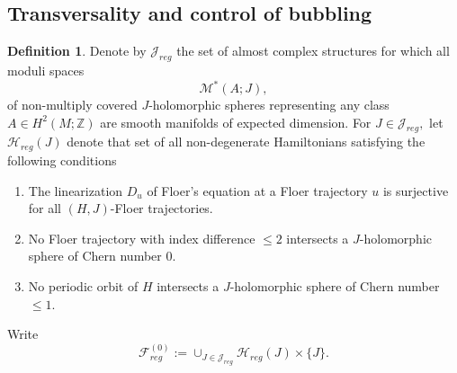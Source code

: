 \documentclass[11pt]{amsart}
\newcommand{\Z}{\mathbb{Z}}
\theoremstyle{definition}
\newtheorem{df}[tm]{Definition}
\theoremstyle{remark}
\begin{document}
\subsection{Transversality and control of bubbling}\label{subsecBubbCont}
\begin{df}\label{Flreg}
Denote by $\mathcal{J}_{reg}$ the set of almost complex structures for which all moduli spaces
\[
\mathcal{M}^*(A;J),
\]
of non-multiply covered $J$-holomorphic spheres representing any class $A\in H^2(M;\Z)$ are smooth manifolds of expected dimension. For $J\in\mathcal{J}_{reg},$ let $\mathcal{H}_{reg}(J)$ denote that set of all non-degenerate Hamiltonians satisfying the following conditions
\begin{enumerate}
    \item The linearization $D_u$ of Floer's equation at a Floer trajectory $u$ is surjective for all $(H,J)$-Floer trajectories.
    \item
         No Floer trajectory with index difference $\leq 2$ intersects a $J$-holomorphic sphere of Chern number $0.$
    \item No periodic orbit of $H$ intersects a $J$-holomorphic sphere of Chern number $\leq1$.
\end{enumerate}
\end{df}
Write
\[
\mathcal{F}^{(0)}_{reg}:=\cup_{J\in\mathcal{J}_{reg}}\mathcal{H}_{reg}(J)\times\{J\}.
\]
\end{document}
